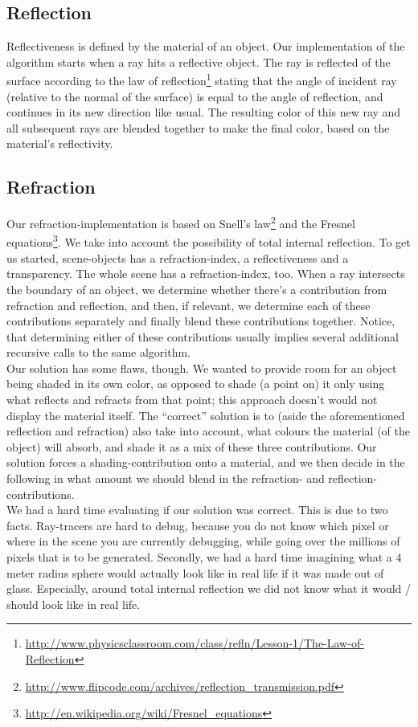 \subsection{Reflection}
Reflectiveness is defined by the material of an object. Our implementation of the algorithm starts when a ray hits a reflective object. The ray is reflected of the surface according to the law of reflection\footnote{\url{http://www.physicsclassroom.com/class/refln/Lesson-1/The-Law-of-Reflection}} stating that the angle of incident ray (relative to the normal of the surface) is equal to the angle of reflection, and continues in its new direction like usual. The resulting color of this new ray and all subsequent rays are blended together to make the final color, based on the material’s reflectivity.

\subsection{Refraction}
Our refraction-implementation is based on Snell’s law\footnote{\url{http://www.flipcode.com/archives/reflection_transmission.pdf}} and the Fresnel equations\footnote{\url{http://en.wikipedia.org/wiki/Fresnel_equations}}. We take into account the possibility of total internal reflection. To get us started, scene-objects has a refraction-index, a reflectiveness and a transparency. The whole scene has a refraction-index, too. When a ray intersects the boundary of an object, we determine whether there’s a contribution from refraction and reflection, and then, if relevant, we determine each of these contributions separately and finally blend these contributions together. Notice, that determining either of these contributions usually implies several additional recursive calls to the same algorithm. \\

Our solution has some flaws, though. We wanted to provide room for an object being shaded in its own color, as opposed to shade (a point on) it only using what reflects and refracts from that point; this approach doesn’t would not display the material itself. The “correct” solution is to (aside the aforementioned reflection and refraction) also take into account, what colours the material (of the object) will absorb, and shade it as a mix of these three contributions. Our solution forces a shading-contribution onto a material, and we then decide in the following in what amount we should blend in the refraction- and reflection-contributions.  \\

We had a hard time evaluating if our solution was correct. This is due to two facts. Ray-tracers are hard to debug, because you do not know which pixel or where in the scene you are currently debugging, while going over the millions of pixels that is to be generated. Secondly, we had a hard time imagining what a 4 meter radius sphere would actually look like in real life if it was made out of glass. Especially, around total internal reflection we did not know what it would / should look like in real life.